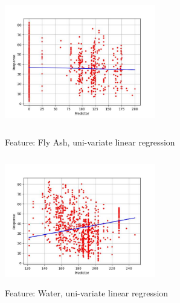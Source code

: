 \documentclass{article}
\begin{document}
\begin{figure}[!htbp]
    \centering
    \begin{minipage}[t]{0.49\textwidth}
        \centering
        \includegraphics[height = 5.6cm, width=6.6cm]{images/2.jpg}
        \caption{Feature: Fly Ash, uni-variate linear regression}
        \label{fig:2}
    \end{minipage}
    \begin{minipage}[t]{0.49\textwidth}
        \centering
        \includegraphics[height = 5.6cm, width=6.6cm]{images/3.jpg}
        \caption{Feature: Water, uni-variate linear regression}
        \label{fig:3}
    \end{minipage}
\end{figure}
\end{document}
